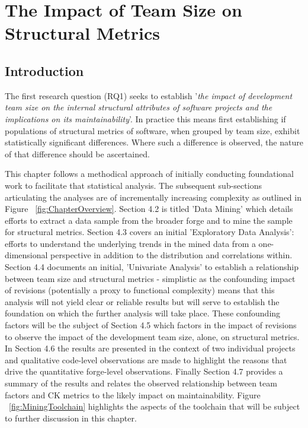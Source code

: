 
\graphicspath{{Chapter4/Figures/}{Chapter4/Tables/}{Chapter4/Charts/}}

\chapter{The Impact of Team Size on Structural Metrics}
\section{Introduction} %

The first research question (RQ1) seeks to establish '\textit{the impact of development team size on the internal structural attributes of software projects and the implications on its maintainability}'. In practice this means first establishing if populations of structural metrics of software, when grouped by team size, exhibit statistically significant differences. Where such a difference is observed, the nature of that difference should be ascertained.

This chapter follows a methodical approach of initially conducting foundational work to facilitate that statistical analysis. The subsequent sub-sections articulating the analyses are of incrementally increasing complexity as outlined in Figure ~\ref{fig:ChapterOverview}. Section 4.2 is titled 'Data Mining' which details efforts to extract a data sample from the broader forge and to mine the sample for structural metrics. Section 4.3 covers an initial 'Exploratory Data Analysis': efforts to understand the underlying trends in the mined data from a one-dimensional perspective in addition to the distribution and correlations within. Section 4.4 documents an initial, 'Univariate Analysis' to establish a relationship between team size and structural metrics - simplistic as the confounding impact of revisions (potentially a proxy to functional complexity) means that this analysis will not yield clear or reliable results but will serve to establish the foundation on which the further analysis will take place. These confounding factors will be the subject of Section 4.5 which factors in the impact of revisions to observe the impact of the development team size, alone, on structural metrics. In Section 4.6 the results are presented in the context of two individual projects and qualitative code-level observations are made to highlight the reasons that drive the quantitative forge-level observations. Finally Section 4.7 provides a summary of the results and relates the observed relationship between team factors and CK metrics to the likely impact on maintainability. Figure ~\ref{fig:MiningToolchain} highlights the aspects of the toolchain that will be subject to further discussion in this chapter.

